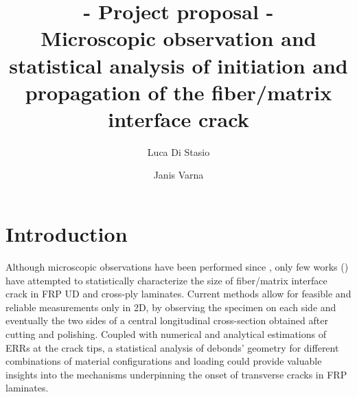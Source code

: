 \documentclass[review]{elsarticle}
\begin{document}
\begin{frontmatter}

\title{{\bf - Project proposal -}\\Microscopic observation and statistical analysis of initiation and propagation of the fiber/matrix interface crack}


\author{Luca Di Stasio}
\author{Janis Varna}






\end{frontmatter}

\linenumbers

\section{Introduction}

Although microscopic observations have been performed since , only few works (\cite{Correa2018,Zumaquero2018}) have attempted to statistically characterize the size of fiber/matrix interface crack in FRP UD and cross-ply laminates. Current methods allow for feasible and reliable measurements only in 2D, by observing the specimen on each side and eventually the two sides of a central longitudinal cross-section obtained after cutting and polishing. Coupled with numerical and analytical estimations of ERRs at the crack tips, a statistical analysis of debonds' geometry for different combinations of material configurations and loading could provide valuable insights into the mechanisms underpinning the onset of transverse cracks in FRP laminates.
\end{document}
